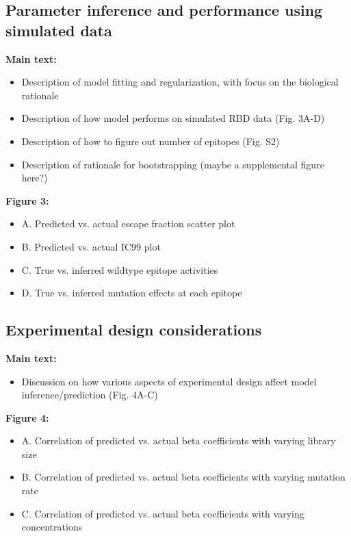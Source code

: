 \documentclass{article}
\begin{document}
\subsection*{Parameter inference and performance using simulated data}

\textbf{Main text:}
\begin{itemize}
	\item Description of model fitting and regularization, with focus on the biological rationale
	\item Description of how model performs on simulated RBD data (Fig. 3A-D)
	\item Description of how to figure out number of epitopes (Fig. S2)
	\item Description of rationale for bootstrapping (maybe a supplemental figure here?) 
\end{itemize}


\noindent\textbf{Figure 3:}
\begin{itemize}
	\item A. Predicted vs. actual escape fraction scatter plot
	\item B. Predicted vs. actual IC99 plot
	\item C. True vs. inferred wildtype epitope activities
	\item D. True vs. inferred mutation effects at each epitope
\end{itemize}

\subsection*{Experimental design considerations}

\textbf{Main text:}
\begin{itemize}
	\item Discussion on how various aspects of experimental design affect model inference/prediction (Fig. 4A-C)
\end{itemize}


\noindent\textbf{Figure 4:}
\begin{itemize}
	\item A. Correlation of predicted vs. actual beta coefficients with varying library size
	\item B. Correlation of predicted vs. actual beta coefficients with varying mutation rate
	\item C. Correlation of predicted vs. actual beta coefficients with varying concentrations
\end{itemize}
\end{document}
